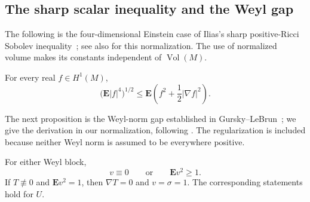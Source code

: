 \subsection{The sharp scalar inequality and the Weyl gap}

The following is the four-dimensional Einstein case of Ilias's sharp
positive-Ricci Sobolev inequality~\cite[Theorem~3]{Ilias}; see also
\cite[Proposition~3.2]{OpenAI2026P} for this normalization.
The use of normalized volume makes its constants independent of
$\operatorname{Vol}(M)$.

\begin{proposition}
\label{prop:sharp-sobolev}
For every real $f\in H^1(M)$,
\[
 \bigl(\mathbf E|f|^4\bigr)^{1/2}
 \le\mathbf E\left(f^2+\frac12|\nabla f|^2\right).
\]
\end{proposition}

The next proposition is the Weyl-norm gap established in
Gursky--LeBrun~\cite[Theorem~1]{GurskyLeBrun1999}; we give the derivation in
our normalization, following \cite[Proposition~3.3]{OpenAI2026P}.
The regularization is included because neither Weyl norm is assumed to
be everywhere positive.

\begin{proposition}
\label{prop:weyl-gap}
For either Weyl block,
\begin{equation}
 v\equiv0\qquad\text{or}\qquad \mathbf E v^2\ge1.
 \tag{5}\label{eq:5}
\end{equation}
If $T\not\equiv0$ and $\mathbf E v^2=1$, then
$\nabla T=0$ and $v=\sigma=1$. The corresponding statements hold
for $U$.
\end{proposition}

